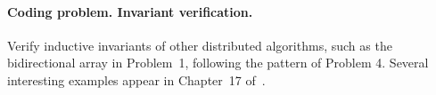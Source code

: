 \documentclass[11pt]{article}
\begin{document}
\paragraph{Coding problem. Invariant verification.}
 Verify inductive invariants of other distributed algorithms, such as the bidirectional array in Problem~1, following the pattern of Problem 4. Several interesting examples appear in Chapter~17 of~\cite{Ghosh:2014:DSA}.




\end{document}

